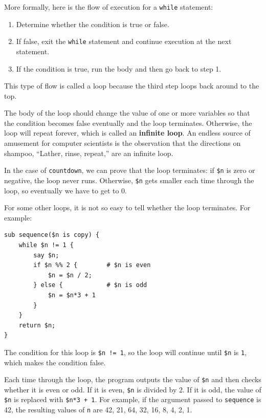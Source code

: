 More formally, here is the flow of execution for a {\tt while} statement:

\begin{enumerate}

\item Determine whether the condition is true or false.

\item If false, exit the {\tt while} statement
and continue execution at the next statement.

\item If the condition is true, run the
body and then go back to step 1.

\end{enumerate}

This type of flow is called a loop because the third step
loops back around to the top.  

The body of the loop should change the value of one or more variables
so that the condition becomes false eventually and the loop
terminates.  Otherwise, the loop will repeat forever, which is called
an {\bf infinite loop}.  An endless source of amusement for computer
scientists is the observation that the directions on shampoo,
``Lather, rinse, repeat,'' are an infinite loop.

In the case of {\tt countdown}, we can prove that the loop
terminates: if {\tt \$n} is zero or negative, the loop never runs.
Otherwise, {\tt \$n} gets smaller each time through the
loop, so eventually we have to get to 0.

For some other loops, it is not so easy to tell whether the 
loop terminates.  For example:

\begin{verbatim}
sub sequence($n is copy) {
    while $n != 1 {
        say $n;
        if $n %% 2 {        # $n is even
            $n = $n / 2;
        } else {            # $n is odd
            $n = $n*3 + 1
        }
    }
    return $n;
}
\end{verbatim}
%
The condition for this loop is {\tt \$n != 1}, so the loop will continue
until {\tt \$n} is {\tt 1}, which makes the condition false.

Each time through the loop, the program outputs the value of {\tt \$n}
and then checks whether it is even or odd.  If it is even, {\tt \$n} is
divided by 2.  If it is odd, the value of {\tt \$n} is replaced with
{\tt \$n*3 + 1}. For example, if the argument passed to {\tt sequence}
is 42, the resulting values of {\tt n} are 42, 21, 64, 32, 16, 8, 4, 2, 1.

